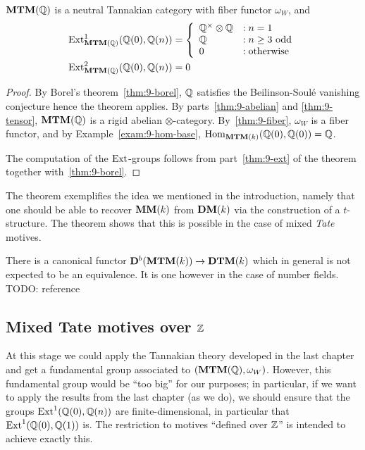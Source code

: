 \begin{cor}\label{cor:9-mtm-tannaka}
  $\mathbf{MTM}(\mathbb{Q})$ is a neutral Tannakian category with fiber functor
  $\omega_{W}$, and
  \begin{align*}
    \mathrm{Ext}^1_{\mathbf{MTM}(\mathbb{Q})}(\mathbb{Q}(0), \mathbb{Q}(n)) &= \left\{ \begin{array}{ll}
        \mathbb{Q}^{\times} \otimes \mathbb{Q} &:n = 1 \\
        \mathbb{Q} &:n\geq 3 \textrm{ odd} \\
        0 &:\textrm{otherwise}
      \end{array} \right.\\
    \mathrm{Ext}^2_{\mathbf{MTM}(\mathbb{Q})}(\mathbb{Q}(0), \mathbb{Q}(n)) &= 0
  \end{align*}
\end{cor}
\begin{proof} By Borel's theorem~\ref{thm:9-borel}, $\mathbb{Q}$ satisfies the
  Beilinson-Soulé vanishing conjecture hence the theorem applies.  By
  parts~\ref{thm:9-abelian} and \ref{thm:9-tensor}, $\mathbf{MTM}(\mathbb{Q})$ is a
  rigid abelian $\otimes$-category. By~\ref{thm:9-fiber}, $\omega_{W}$
  is a fiber functor, and by Example~\ref{exam:9-hom-base},
  $\mathrm{Hom}_{\mathbf{MTM}(k)}(\mathbb{Q}(0),\mathbb{Q}(0))=\mathbb{Q}$.

  The computation of the $\mathrm{Ext}$-groups follows from
  part~\ref{thm:9-ext} of the theorem together with~\ref{thm:9-borel}.
\end{proof}

\begin{rem}
  The theorem exemplifies the idea we mentioned in the introduction,
  namely that one should be able to recover $\mathbf{MM}(k)$ from $\mathbf{DM}(k)$ via
  the construction of a $t$-structure. The theorem shows that this is
  possible in the case of mixed \emph{Tate} motives.

  There is a canonical functor $\mathbf{D}^{b}(\mathbf{MTM}(k))\to \mathbf{DTM}(k)$ which in
  general is not expected to be an equivalence. It is one however in
  the case of number fields. TODO: reference
\end{rem}
\subsection{Mixed Tate motives over $\mathbb{Z}$}

At this stage we could apply the Tannakian theory developed in the
last chapter and get a fundamental group associated to
$(\mathbf{MTM}(\mathbb{Q}),\omega_{W})$. However, this fundamental group would be
``too big'' for our purposes; in particular, if we want to apply the
results from the last chapter (as we do), 
we should ensure that the groups $\mathrm{Ext}^1(\mathbb{Q}(0), \mathbb{Q}(n))$ are
finite-dimensional, in particular that $\mathrm{Ext}^1(\mathbb{Q}(0), \mathbb{Q}(1))$ is. The
restriction to motives ``defined over $\mathbb{Z}$'' is intended to achieve
exactly this.


